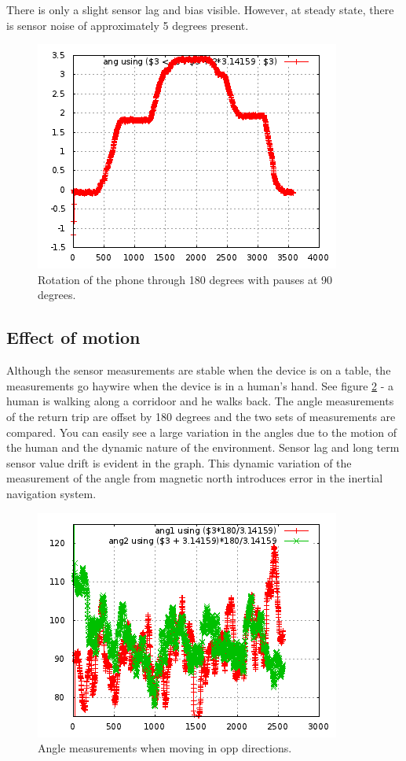 There is only a slight sensor lag and bias visible. However, at steady state,
there is sensor noise of approximately 5 degrees present.

\begin{figure}\centering
    \includegraphics{figures/angle_180_rotation_table.png}
    \caption{Rotation of the phone through 180 degrees with pauses at 90 degrees.\label{fig:angle_180_rotation_table}}
\end{figure}


\subsection{Effect of motion}

Although the sensor measurements are stable when the device is on a table,
the measurements go haywire when the device is in a human's hand. See figure
\ref{fig:angle_180_corridoor} - a human is walking along a corridoor and he walks
back. The angle measurements of the return trip are offset by 180 degrees and
the two sets of measurements are compared. You can easily see a large variation
in the angles due to the motion of the human and the dynamic nature of the environment.
Sensor lag and long term sensor value drift is evident in the graph.
This dynamic variation of the measurement of the angle from magnetic north 
introduces error in the inertial navigation system.

\begin{figure}\centering
    \includegraphics{figures/angle_180_corridoor.png}
    \caption{Angle measurements when moving in opp directions.\label{fig:angle_180_corridoor}}
\end{figure}


